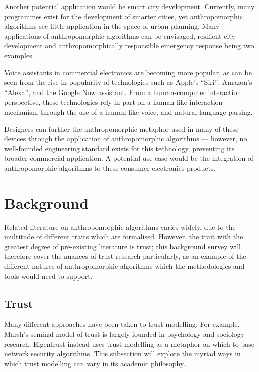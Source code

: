 Another potential application would be smart city development. Currently, many programmes exist for the development of smarter cities\cite{nam2011conceptualizing}, yet anthropomorphic algorithms see little application in the space of urban planning. Many applications of anthropomorphic algorithms can be envisaged\cite{wallis_x}, resilient city development and anthropomorphically responsible emergency response being two examples.\par

Voice assistants in commercial electronics are becoming more popular, as can be seen from the rise in popularity of technologies such as Apple's ``Siri'', Amazon's ``Alexa'', and the Google Now assistant. From a human-computer interaction perspective, these technologies rely in part on a human-like interaction mechanism through the use of a human-like voice, and natural language parsing.\par

Designers can further the anthropomorphic metaphor used in many of these devices through the application of anthropomorphic algorithms --- however, no well-founded engineering standard exists for this technology, preventing its broader commercial application. A potential use case would be the integration of anthropomorphic algorithms to these consumer electronics products.\par

\section{Background}
\label{sec:background}
Related literature on anthropomorphic algorithms varies widely, due to the multitude of different traits which are formalised. However, the trait with the greatest degree of pre-existing literature is trust; this background survey will therefore cover the nuances of trust research particularly, as an example of the different natures of anthropomorphic algorithms which the methodologies and tools would need to support.\par

\subsection{Trust}\label{sec:trust}
Many different approaches have been taken to trust modelling. For example, Marsh's seminal model of trust\cite{marsh1994} is largely founded in psychology and sociology research; Eigentrust\cite{Kamvar2003} instead uses trust modelling as a metaphor on which to base network security algorithms. This subsection will explore the myriad ways in which trust modelling can vary in its academic philosophy.\par

